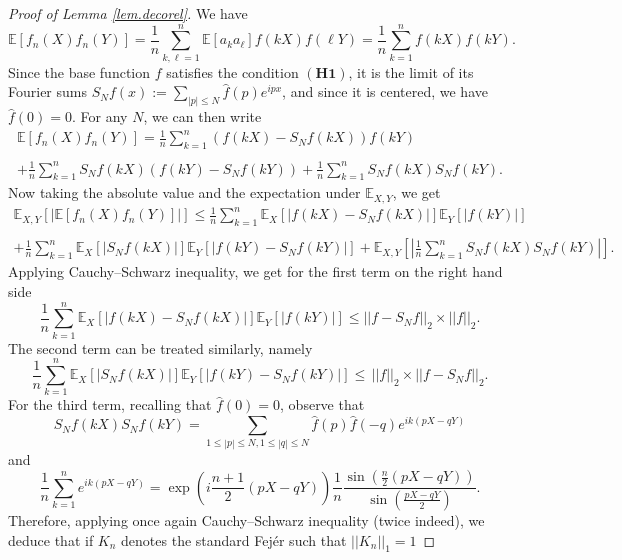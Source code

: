 \documentclass[10pt,a4paper]{amsart}
\begin{document}
\begin{proof}[Proof of Lemma \ref{lem.decorel}]
We have
\[
\mathbb E[f_n(X)f_n(Y)]=\frac{1}{n}\sum_{k,\ell=1}^{n}\mathbb E[a_ka_{\ell}]f(kX)f(\ell Y)=\frac{1}{n}\sum_{k=1}^{n}f(kX)f(kY).
\]
{Since the base function $f$ satisfies the condition $\mathbf{(H1)}$, it is the limit of its Fourier sums $S_N f(x):=\sum_{|p| \leq N} \widehat{f}(p) e^{i p x}$, and since it is centered, we have $ \widehat{f}(0) =0$}. For any $N$, we can then write 
\[
\begin{array}{ll}
\mathbb E[f_n(X)f_n(Y)]  =\displaystyle{\frac{1}{n}\sum_{k=1}^{n} \left( f(kX)-S_N f(kX)\right) f(kY)}\\
\\
  + \displaystyle{\frac{1}{n}\sum_{k=1}^{n} S_N f(kX) \left(f(kY)-S_N f(kY)\right)
  +\frac{1}{n}\sum_{k=1}^{n} S_N f(kX) S_N f(kY).}
\end{array}
\]
Now taking the absolute value and the expectation under $\mathbb E_{X,Y}$, we get 
\[
\begin{array}{l}
\mathbb E_{X,Y} \left[ \left|\mathbb E[f_n(X)f_n(Y)] \right|\right] \leq \displaystyle{\frac{1}{n}\sum_{k=1}^{n} \mathbb E_X\left[ \left| f(kX)-S_N f(kX)\right|\right] \mathbb E_Y \left[\left|f(kY)\right|\right]}\\
\\
  + \displaystyle{\frac{1}{n}\sum_{k=1}^{n} \mathbb E_X\left[|S_N f(kX)| \right] \mathbb E_Y\left[ |f(kY)-S_N f(kY)|\right]} 
+ \displaystyle{\mathbb E_{X,Y}\left[ \left| \frac{1}{n}\sum_{k=1}^{n} S_N f(kX) S_N f(kY)\right|\right].}
\end{array}
\]
Applying Cauchy--Schwarz inequality, we get for the first term on the right hand side
\[
\frac{1}{n}\sum_{k=1}^{n} \mathbb E_X\left[ \left| f(kX)-S_N f(kX)\right|\right] \mathbb E_Y \left[\left|f(kY)\right|\right] \leq   ||f-S_Nf ||_2 \times ||f||_2.
\]
The second term can be treated similarly, namely 
\[
\frac{1}{n}\sum_{k=1}^{n} \mathbb E_X\left[|S_N f(kX)| \right] \mathbb E_Y\left[ |f(kY)-S_N f(kY)|\right]\leq \, ||f||_2 \times  ||f-S_Nf ||_2.
\]
For the third term, {recalling that $ \widehat{f}(0)=0$}, observe that 
\[
S_Nf(kX) S_Nf(k Y)
= \sum_{1\leq |p|\leq N,1\leq |q|\leq N}\widehat{f}(p)\widehat{f}(-q)e^{ik(pX-qY)} 
\]
and
$$\frac{1}{n}\sum_{k=1}^{n}e^{ik(pX-qY)}=\exp\left(i\frac{n+1}{2}(pX-qY)\right)\frac{1}{n}\frac{\sin\left(\frac{n}{2}(pX-qY)\right)}{\sin\left(\frac{pX-qY}{2}\right)}.$$
Therefore, applying once again Cauchy--Schwarz inequality (twice indeed), we deduce that if $K_n$ denotes the standard Fej\'er such that $||K_n||_1=1$

\end{proof}
\end{document}
